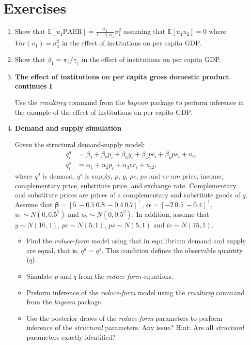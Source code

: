 \section{Exercises}\label{sec76}
\begin{enumerate}
	\item Show that $\mathbb{E}[u_1\text{PAER}]=\frac{\alpha_1}{1-\beta_1\alpha_1}\sigma^2_1$ assuming that $\mathbb{E}[u_1u_2]=0$ where $Var(u_1)=\sigma^2_1$ in the effect of institutions on per capita GDP.
	
	\item Show that $\beta_1=\pi_1/\gamma_1$ in the effect of institutions on per capita GDP.
	
	\item \textbf{The effect of institutions on per capita gross domestic product continues I}
	
	Use the \textit{rmultireg} command from the \textit{bayesm} package to perform inference in the example of the effect of institutions on per capita GDP. 
	
	\item \textbf{Demand and supply simulation}
	
	Given the structural demand-supply model:
	\begin{align*}
		q_i^d&=\beta_1+\beta_2p_i+\beta_3y_i+\beta_4pc_i+\beta_5ps_i+u_{i1}\\
		q_i^s&=\alpha_1+\alpha_2p_i+\alpha_3er_i+u_{i2},
	\end{align*}
where $q^d$ is demand, $q^s$ is supply, $p$, $y$, $pc$, $ps$ and $er$ are price, income, complementary price, substitute price, and exchange rate. Complementary and substitute prices are prices of a complementary and substitute goods of $q$. Assume that $\bm{\beta}=\left[5 \ -0.5 \ 0.8 \ -0.4 \ 0.7\right]^{\top}$, $\bm{\alpha}=\left[-2 \ 0.5 \ -0.4\right]^{\top}$, $u_1\sim N(0, 0.5^2)$ and $u_2\sim N(0, 0.5^2)$. In addition, assume that $y\sim N(10,1)$, $pc\sim N(5,1)$, $ps\sim N(5,1)$ and $tc\sim N(15,1)$.
\begin{itemize}
	\item Find the \textit{reduce-form} model using that in equilibrium demand and supply are equal, that is, $q^d=q^s$. This condition defines the observable quantity ($q$).
	\item Simulate $p$ and $q$ from the \textit{reduce-form} equations.
	\item Preform inference of the \textit{reduce-form} model using the \textit{rmultireg} command from the \textit{bayesm} package.
	\item Use the posterior draws of the \textit{reduce-form} parameters to perform inference of the \textit{structural} parameters. Any issue? Hint: Are all \textit{structural} parameters exactly identified?   
\end{itemize}


\end{enumerate}
